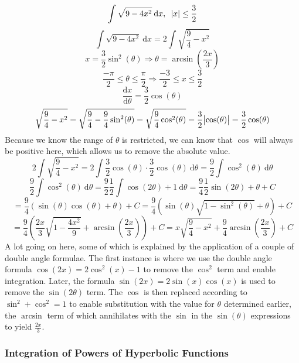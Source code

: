 \documentclass[12pt]{report}
\newcommand{\dx}{\:\mathrm{d}x}
\newcommand{\dd}[2]{\frac{\mathrm{d}#1}{\mathrm{d}#2}}
\begin{document}
\begin{flushleft}
\begin{center}
\[\int\sqrt{9 - 4x^2}\dx, \:\:\: \abs{x} \leq \frac{3}{2}\]
\[\int\sqrt{9 - 4x^2}\dx = 2\int\sqrt{\frac{9}{4} - x^2}\]
\[x = \frac{3}{2}\sin^2(\theta) \Rightarrow \theta = 
\arcsin\left(\frac{2x}{3}\right)\] 
\[\frac{-\pi}{2} \leq \theta \leq \frac{\pi}{2} \Rightarrow \frac{-3}{2} \leq
x \leq \frac{3}{2}\]
\[\dd{x}{\theta} = \frac{3}{2}\cos(\theta)\]
\[\sqrt{\frac{9}{4} - x^2} = \sqrt{\frac{9}{4} - \frac{9}{4}\sin^2(\theta)} =
\sqrt{\frac{9}{4}\cos^2(\theta)} = \frac{3}{2}\abs{\cos(\theta)} 
= \frac{3}{2}\cos(\theta)\]
Because we know the range of \(\theta\) is restricted, we can know that
\(\cos\) will always be positive here, which allows us to remove the absolute
value.
\[2\int\sqrt{\frac{9}{4} - x^2} = 2\int\frac{3}{2}\cos(\theta)\cdot\frac{3}{2}
\cos(\theta)\:\mathrm{d}\theta 
= \frac{9}{2}\int\cos^2(\theta)\:\mathrm{d}\theta\]
\[\frac{9}{2}\int\cos^2(\theta)\:\mathrm{d}\theta = \frac{9}{2}\frac{1}{2}
\int\cos(2\theta) + 1\:\mathrm{d}\theta = \frac{9}{4}\frac{1}{2}\sin(2\theta)
+ \theta + C\]
\[= \frac{9}{4}\left(\sin(\theta)\cos(\theta) + \theta\right) + C = \frac{9}{4}
\left(\sin(\theta)\sqrt{1 - \sin^2(\theta)} + \theta\right) + C\]
\[= \frac{9}{4}\left(\frac{2x}{3}\sqrt{1 - \frac{4x^2}{9}} + 
\arcsin\left(\frac{2x}{3}\right)\right) + C = x\sqrt{\frac{9}{4} - x^2} 
+ \frac{9}{4}\arcsin\left(\frac{2x}{3}\right) + C\]
A lot going on here, some of which is explained by the application of a couple
of double angle formulae. The first instance is where we use the double angle
formula \(\cos(2x) = 2\cos^2(x) - 1\) to remove the \(\cos^2\) term and enable
integration. Later, the formula \(\sin(2x) = 2\sin(x)\cos(x)\) is used to
remove the \(\sin(2\theta)\) term. The \(\cos\) is then replaced according to
\(\sin^2 + \cos^2 = 1\) to enable substitution with the value for \(\theta\)
determined earlier, the \(\arcsin\) term of which annihilates with the 
\(\sin\) in the \(\sin(\theta)\) expressions to yield \(\frac{2x}{3}\).
\end{center}

\subsubsection*{Integration of Powers of Hyperbolic Functions}


\end{flushleft}
\end{document}
